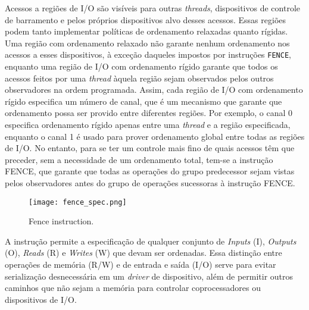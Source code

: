 		Acessos a regiões de I/O são visíveis para outras \textit{threads}, dispositivos de controle
		de barramento e pelos próprios dispositivos alvo desses acessos. Essas regiões podem tanto
		implementar políticas de ordenamento relaxadas quanto rígidas. Uma região com ordenamento
		relaxado não garante nenhum ordenamento nos acessos a esses dispositivos, à exceção daqueles
		impostos por instruções \texttt{FENCE}, enquanto uma região de I/O com ordenamento
		rígido garante que todos os acessos feitos por uma \textit{thread} àquela região sejam observados
		pelos outros observadores na ordem programada. Assim, cada região de I/O com ordenamento
		rígido especifica um número de canal, que é um mecanismo que garante que ordenamento possa
		ser provido entre diferentes regiões. Por exemplo, o canal 0 especifica ordenamento rígido
		apenas entre uma \textit{thread} e a região especificada, enquanto o canal 1 é usado para prover
		ordenamento global entre todas as regiões de I/O. No entanto, para se ter um controle mais
		fino de quais acessos têm que preceder, sem a necessidade de um ordenamento total, tem-se
		a instrução FENCE, que garante que todas as operações do grupo predecessor sejam vistas
		pelos observadores antes do grupo de operações sucessoras à instrução FENCE.

		\begin{figure}[t]
			\centering
			\texttt{[image: fence\_spec.png]}
			\caption{Fence instruction.}
		\end{figure}

		A instrução permite a especificação de qualquer conjunto de \textit{Inputs} (I),
		\textit{Outputs} (O), \textit{Reads} (R) e \textit{Writes} (W) que devam ser
		ordenadas. Essa distinção entre operações de memória (R/W) e de entrada e saída (I/O)
		serve para evitar serialização desnecessária em um \textit{driver} de dispositivo, além
		de permitir outros caminhos que não sejam a memória para controlar coprocessadores ou
		dispositivos de I/O.


